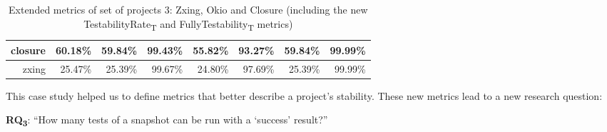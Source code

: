 \begin{table}[h!]
{\begin{tabular}{|r|r|r|r|r|r|r|r|}
            closure                                & 60.18\%                                                                                        & 59.84\%                                                                                       & 99.43\%                                                                                       & 55.82\%                                                                                      & 93.27\%                                                                                      & 59.84\%                                                                                     & 99.99\%                                                                                     \\ \hline
            zxing                                  & 25.47\%                                                                                        & 25.39\%                                                                                       & 99.67\%                                                                                       & 24.80\%                                                                                      & 97.69\%                                                                                      & 25.39\%                                                                                     & 99.99\%                                                                                    \\ \hline
        \end{tabular}
    }
    \caption{Extended metrics of set of projects 3: Zxing, Okio and Closure (including the new TestabilityRate\textsubscript{T} and FullyTestability\textsubscript{T} metrics)}
    \label{table:projects-3-with-flavor-testability-rate}
\end{table}


\def \RQIII{How many tests of a snapshot can be run with a `success' result?}

This case study helped us to define metrics that better describe a project's stability. These new metrics lead to a new research question: 

\textbf{RQ\textsubscript{3}}: ``\RQIII''
